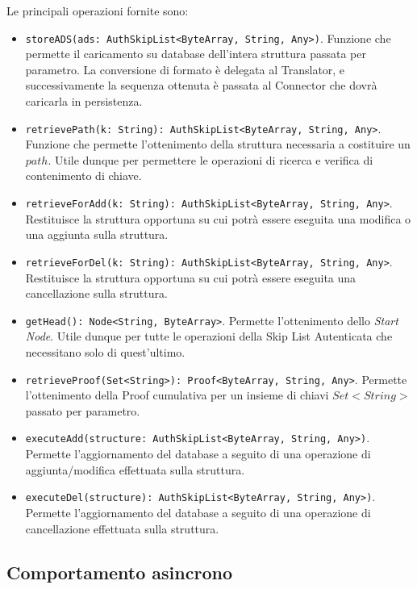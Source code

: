 		Le principali operazioni fornite sono:
			\begin{itemize}
			\item \verb!storeADS(ads: AuthSkipList<ByteArray, String, Any>)!. Funzione che permette il caricamento su database dell'intera struttura passata per parametro. La conversione di formato è delegata al Translator, e successivamente la sequenza ottenuta è passata al Connector che dovrà caricarla in persistenza.
			\item \verb!retrievePath(k: String): AuthSkipList<ByteArray, String, Any>!. Funzione che permette l'ottenimento della struttura necessaria a costituire un $ path $. Utile dunque per permettere le operazioni di ricerca e verifica di contenimento di chiave.
			\item \verb!retrieveForAdd(k: String): AuthSkipList<ByteArray, String, Any>!. Restituisce la struttura opportuna su cui potrà essere eseguita una modifica o una aggiunta sulla struttura.
			\item \verb!retrieveForDel(k: String): AuthSkipList<ByteArray, String, Any>!. Restituisce la struttura opportuna su cui potrà essere eseguita una cancellazione sulla struttura.
			\item \verb!getHead(): Node<String, ByteArray>!. Permette l'ottenimento dello \textit{Start Node}. Utile dunque per tutte le operazioni della Skip List Autenticata che necessitano solo di quest'ultimo.
			\item \verb!retrieveProof(Set<String>): Proof<ByteArray, String, Any>!. Permette l'ottenimento della Proof cumulativa per un insieme di chiavi $ Set<String> $ passato per parametro.
			\item \verb!executeAdd(structure: AuthSkipList<ByteArray, String, Any>)!. Permette l'aggiornamento del database a seguito di una operazione di aggiunta/modifica effettuata sulla struttura.
			\item \verb!executeDel(structure): AuthSkipList<ByteArray, String, Any>)!. Permette l'aggiornamento del database a seguito di una operazione di cancellazione effettuata sulla struttura.		
		\end{itemize}
		
	\subsection{Comportamento asincrono}
	

